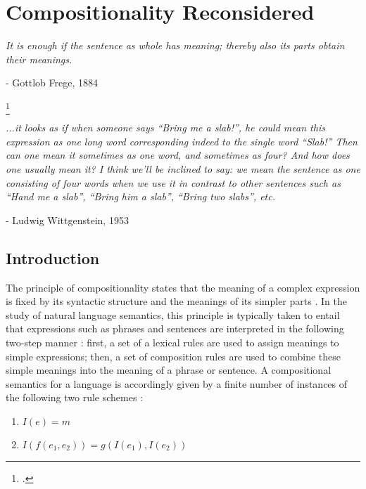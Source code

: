 
\chapter{Compositionality Reconsidered}
\renewcommand{\epigraphrule}{0pt}
\setlength{\epigraphwidth}{4.5in}
\epigraph{\textit{It is enough if the sentence as whole has meaning; thereby also its parts obtain their meanings.}}{- Gottlob Frege, 1884}\footcitetext[qtd. in][]{Szabo:2012}

\epigraph{\textit{...it looks as if when someone says ``Bring me a slab!'', he could mean this expression as one long word corresponding indeed to the single word ``Slab!'' Then can one mean it sometimes as one word, and sometimes as four? And how does one usually mean it? I think we'll be inclined to say: we mean the sentence as one consisting of four words when we use it in contrast to other sentences such as ``Hand me a slab'', ``Bring him a slab'', ``Bring two slabs'', etc.}}{- Ludwig Wittgenstein, 1953}

\section{Introduction}

The principle of compositionality states that the meaning of a complex expression is fixed by its syntactic structure and the meanings of its simpler parts \citep{Szabo:2013,Szabo:2012,FodorLepore:1991}. In the study of natural language semantics, this principle is typically taken to entail that expressions such as phrases and sentences are interpreted in the following two-step manner \citep{Recanati:2012}: first, a set of a lexical rules are used to assign meanings to simple expressions; then, a set of composition rules are used to combine these simple meanings into the meaning of a phrase or sentence. A compositional semantics for a language is accordingly given by a finite number of instances of the following two rule schemes \citep[pp. 175-76]{Recanati:2012}:


\begin{enumerate}
  \item $ I(e) = m $
  \item $ I(f(e_1, e_2)) = g(I(e_1),I(e_2)) $
\end{enumerate}

